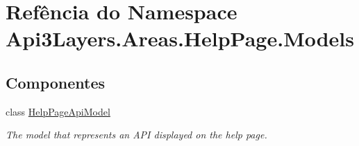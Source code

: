 \hypertarget{namespaceApi3Layers_1_1Areas_1_1HelpPage_1_1Models}{}\section{Refência do Namespace Api3\+Layers.\+Areas.\+Help\+Page.\+Models}
\label{namespaceApi3Layers_1_1Areas_1_1HelpPage_1_1Models}
\subsection*{Componentes}
\begin{DoxyCompactItemize}
\item 
class \hyperlink{classApi3Layers_1_1Areas_1_1HelpPage_1_1Models_1_1HelpPageApiModel}{Help\+Page\+Api\+Model}
\begin{DoxyCompactList}\small\item\em The model that represents an A\+PI displayed on the help page. \end{DoxyCompactList}\end{DoxyCompactItemize}
